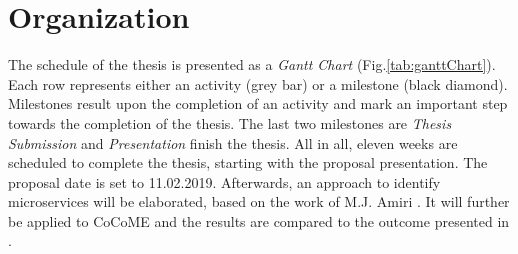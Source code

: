 \chapter{Organization}
\label{ch:timetable}
The schedule of the thesis is presented as a \textit{Gantt Chart} (Fig.\ref{tab:ganttChart}). Each row represents either an activity (grey bar) or a milestone (black diamond). Milestones result upon the completion of an activity and mark an important step towards the completion of the thesis. The last two milestones are \textit{Thesis Submission} and \textit{Presentation} finish the thesis. All in all, eleven weeks are scheduled to complete the thesis, starting with the proposal presentation. The proposal date is set to 11.02.2019. Afterwards, an approach to identify microservices will be elaborated, based on the work of M.J. Amiri \cite{ObjectAwareAmiri}.  It will further be applied to CoCoME and the results are compared to the outcome presented in \cite{FunctionalDecompositionHeinrich}.\\





